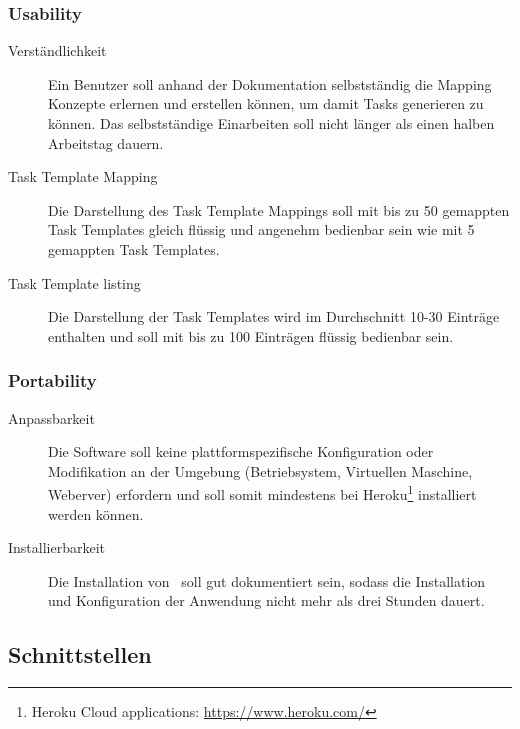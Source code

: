		\subsubsection{Usability}
		\begin{description}
			\item[Verständlichkeit] Ein Benutzer soll anhand der Dokumentation selbstständig die Mapping Konzepte erlernen und erstellen können, um damit Tasks generieren zu können. Das selbstständige Einarbeiten soll nicht länger als einen halben Arbeitstag dauern.
			\item[Task Template Mapping] Die Darstellung des Task Template Mappings soll mit bis zu 50 gemappten Task Templates gleich flüssig und angenehm bedienbar sein wie mit 5 gemappten Task Templates.
			\item[Task Template listing] Die Darstellung der Task Templates wird im Durchschnitt 10-30 Einträge enthalten und soll mit bis zu 100 Einträgen flüssig bedienbar sein.
		\end{description}

		
		\subsubsection{Portability}
		\begin{description}
			\item[Anpassbarkeit] Die Software soll keine plattformspezifische Konfiguration oder Modifikation an der Umgebung (Betriebsystem, Virtuellen Maschine, Weberver) erfordern und soll somit mindestens bei Heroku\footnote{Heroku Cloud applications: \url{https://www.heroku.com/}} installiert werden können.
			\item[Installierbarkeit] Die Installation von \eeppi\ soll gut dokumentiert sein, sodass die Installation und Konfiguration der Anwendung nicht mehr als drei Stunden dauert.
		\end{description}

	\subsection{Schnittstellen}
